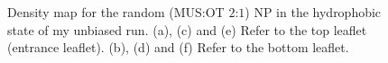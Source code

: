 \begin{figure}[p]
{		}\\%
		\,%
	\caption{Density map for the random (\acs{MUS}:\acs{OT} $2$:$1$) \acs{NP} in the hydrophobic state of my unbiased run. (a), (c) and (e) Refer to the top leaflet (entrance leaflet). (b), (d) and (f) Refer to the bottom leaflet.}%
	\label{fig:random21Density}
\end{figure}
%
